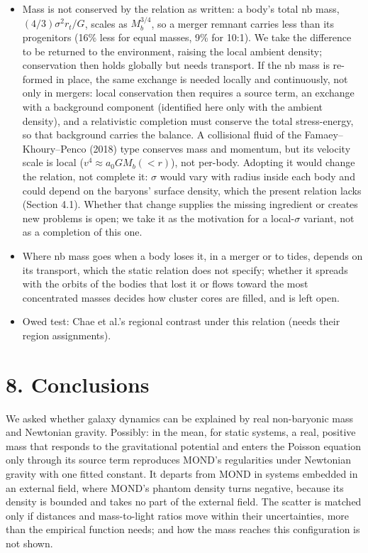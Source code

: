 \documentclass[
  10pt,
]{article}
\begin{document}
\begin{itemize}
\item Mass is not conserved by the relation as written: a body's total nb mass, $(4/3)\sigma^2r_t/G$, scales as $M_b^{3/4}$, so a merger remnant carries less than its progenitors (16\% less for equal masses, 9\% for 10:1). We take the difference to be returned to the environment, raising the local ambient density; conservation then holds globally but needs transport. If the nb mass is re-formed in place, the same exchange is needed locally and continuously, not only in mergers: local conservation then requires a source term, an exchange with a background component (identified here only with the ambient density), and a relativistic completion must conserve the total stress-energy, so that background carries the balance. A collisional fluid of the Famaey--Khoury--Penco (2018) type conserves mass and momentum, but its velocity scale is local ($v^4\approx a_0GM_b(<r)$), not per-body. Adopting it would change the relation, not complete it: $\sigma$ would vary with radius inside each body and could depend on the baryons' surface density, which the present relation lacks (Section 4.1). Whether that change supplies the missing ingredient or creates new problems is open; we take it as the motivation for a local-$\sigma$ variant, not as a completion of this one.
\item Where nb mass goes when a body loses it, in a merger or to tides, depends on its transport, which the static relation does not specify; whether it spreads with the orbits of the bodies that lost it or flows toward the most concentrated masses decides how cluster cores are filled, and is left open.
\item Owed test: Chae et al.'s regional contrast under this relation (needs their region assignments).
\end{itemize}


\section{8. Conclusions}\label{conclusions}

We asked whether galaxy dynamics can be explained by real non-baryonic mass and Newtonian gravity. Possibly: in the mean, for static systems, a real, positive mass that responds to the gravitational potential and enters the Poisson equation only through its source term reproduces MOND's regularities under Newtonian gravity with one fitted constant. It departs from MOND in systems embedded in an external field, where MOND's phantom density turns negative, because its density is bounded and takes no part of the external field. The scatter is matched only if distances and mass-to-light ratios move within their uncertainties, more than the empirical function needs; and how the mass reaches this configuration is not shown.
\end{document}

